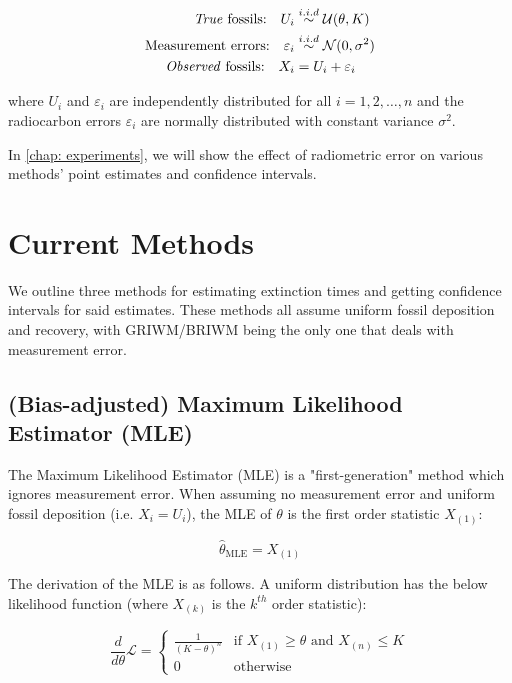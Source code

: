 \begin{align*}
    \text{\textit{True} fossils:} \quad U_i  &\overset{i.i.d}{\sim} \mathcal{U}(\theta, K) \\
    \text{Measurement errors:} \quad \varepsilon_i &\overset{i.i.d}{\sim} \mathcal{N}(0, \sigma^2) \\
    \text{\textit{Observed} fossils:} \quad X_i &= U_i + \varepsilon_i 
\end{align*}

where $U_i$ and $\varepsilon_i$ are independently distributed for all $i = 1, 2, \dots, n$ and the radiocarbon errors $\varepsilon_i$ are normally distributed with constant variance $\sigma^2$.

In \autoref{chap: experiments}, we will show the effect of radiometric error on various methods' point estimates and confidence intervals.

\section{Current Methods}

We outline three methods for estimating extinction times and getting confidence intervals for said estimates. These methods all assume uniform fossil deposition and recovery, with GRIWM/BRIWM being the only one that deals with measurement error.

\subsection{(Bias-adjusted) Maximum Likelihood Estimator (MLE)}

The Maximum Likelihood Estimator (MLE) is a "first-generation" method which ignores measurement error. When assuming no measurement error and uniform fossil deposition (i.e. $X_i = U_i$), the MLE of $\theta$ is the first order statistic $X_{(1)}$:

\begin{equation}\label{eq:mle}
    \hat\theta_{\text{MLE}} = X_{(1)}
\end{equation}

The derivation of the MLE is as follows. A uniform distribution has the below likelihood function (where $X_{(k)}$ is the $k^{th}$ order statistic):

\[
\frac{d}{d\theta}\mathcal{L} = \begin{cases}
    \frac{1}{(K-\theta)^n} & \text{if $X_{(1)} \geq \theta$ and $X_{(n)} \leq K$} \\
    0 & \text{otherwise}
\end{cases}
\]


